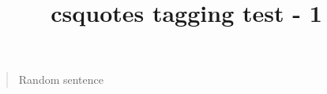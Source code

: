 \documentclass{article}
\title{csquotes tagging test - 1}
\begin{document}
\blockquote{Random sentence}
\end{document}
